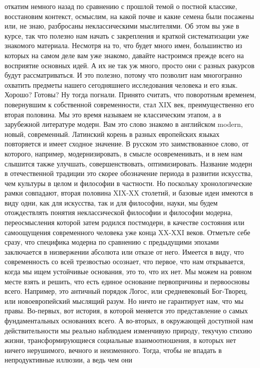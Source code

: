 откатим немного назад по сравнению с прошлой темой о постной классике,
восстановим контекст, осмыслим, на какой почве и какие семена были посажены или,
не знаю, разбросаны неклассическими мыслителями. Об этом вы уже в курсе, так что
полезно нам начать с закрепления и краткой систематизации уже знакомого
материала. Несмотря на то, что будет много имен, большинство из которых на самом
деле вам уже знакомо, давайте настроимся прежде всего на восприятие основных
идей. А их не так уж много, просто они с разных ракурсов будут рассматриваться.
И это полезно, потому что позволит нам многогранно охватить предметы нашего
сегодняшнего исследования человека и его язык. Хорошо? Готовы? Ну тогда погнали.
Принято считать, что поворотным временем, повернувшим к собственной
современности, стал XIX век, преимущественно его вторая половина. Мы это время
называем не классическим этапом, а в зарубежной литературе модерн. Вам это слово
знакомо в английском modern, новый, современный. Латинский корень в разных
европейских языках повторяется и имеет сходное значение. В русском это
заимствованное слово, от которого, например, модернизировать, в смысле
осовременивать, и в нем нам слышится также улучшать, совершенствовать,
оптимизировать. Название модерн в отечественной традиции это скорее обозначение
периода в развитии искусства, чем культуры в целом и философии в частности. Но
поскольку хронологические рамки совпадают, вторая половина XIX-XX столетий, и
базовые идеи имеются в виду одни, как для искусства, так и для философии, науки,
мы будем отождествлять понятия неклассической философии и философии модерна,
переосмысления которой затем родился постмодерн, в качестве состояния или
самоощущения современного человека уже конца XX-XXI веков. Отметьте себе сразу,
что специфика модерна по сравнению с предыдущими эпохами заключается в
низвержении абсолюта или отказе от него. Имеется в виду, что современность со
всей трезвостью осознает, что первое, что нам открывается, когда мы ищем
устойчивые основания, это то, что их нет. Мы можем на ровном месте взять и
решить, что есть единое основание первопричины и первоосновы всего. Например,
это античный порядок Логос, или средневековый Бог-Творец, или новоевропейский
мыслящий разум. Но ничто не гарантирует нам, что мы правы. Во-первых, вот
история, в которой меняется это представление о самых фундаментальных основаниях
всего. А во-вторых, в окружающей доступной нам действительности мы реально
наблюдаем изменчивую природу, текучую стихию жизни, трансформирующиеся
социальные взаимоотношения, в которых нет ничего нерушимого, вечного и
неизменного. Тогда, чтобы не впадать в непродуктивные иллюзии, а ведь чем они
